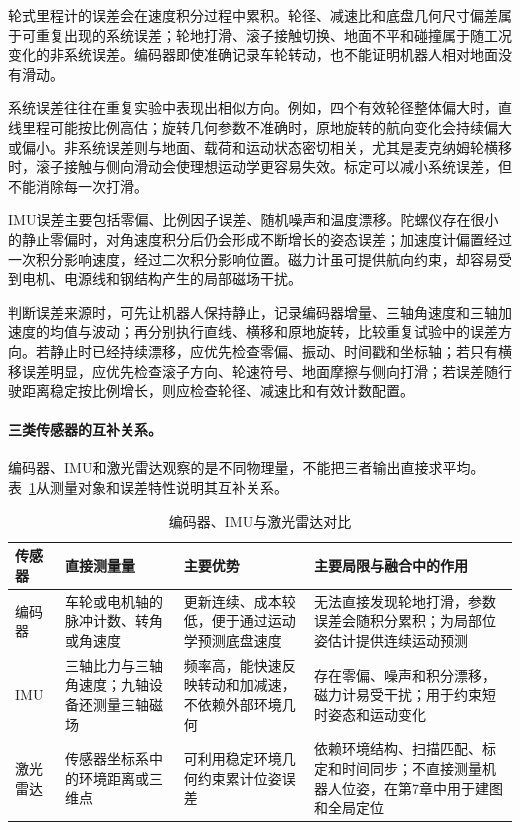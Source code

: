 \documentclass[UTF8,zihao=-4]{ctexart}
\begin{document}
轮式里程计的误差会在速度积分过程中累积。轮径、减速比和底盘几何尺寸偏差属于可重复出现的系统误差；轮地打滑、滚子接触切换、地面不平和碰撞属于随工况变化的非系统误差。编码器即使准确记录车轮转动，也不能证明机器人相对地面没有滑动\cite{borenstein1996}。

系统误差往往在重复实验中表现出相似方向。例如，四个有效轮径整体偏大时，直线里程可能按比例高估；旋转几何参数不准确时，原地旋转的航向变化会持续偏大或偏小。非系统误差则与地面、载荷和运动状态密切相关，尤其是麦克纳姆轮横移时，滚子接触与侧向滑动会使理想运动学更容易失效。标定可以减小系统误差，但不能消除每一次打滑。

IMU误差主要包括零偏、比例因子误差、随机噪声和温度漂移。陀螺仪存在很小的静止零偏时，对角速度积分后仍会形成不断增长的姿态误差；加速度计偏置经过一次积分影响速度，经过二次积分影响位置。磁力计虽可提供航向约束，却容易受到电机、电源线和钢结构产生的局部磁场干扰\cite{fan2025fusion}。

判断误差来源时，可先让机器人保持静止，记录编码器增量、三轴角速度和三轴加速度的均值与波动；再分别执行直线、横移和原地旋转，比较重复试验中的误差方向。若静止时已经持续漂移，应优先检查零偏、振动、时间戳和坐标轴；若只有横移误差明显，应优先检查滚子方向、轮速符号、地面摩擦与侧向打滑；若误差随行驶距离稳定按比例增长，则应检查轮径、减速比和有效计数配置。

\paragraph{三类传感器的互补关系。}
编码器、IMU和激光雷达观察的是不同物理量，不能把三者输出直接求平均。表~\ref{tab:sensor-complementarity}从测量对象和误差特性说明其互补关系。

\begin{table}[htbp]
  \centering
  \caption{编码器、IMU与激光雷达对比}
  \label{tab:sensor-complementarity}
  \begin{tabular}{p{}p{}p{}p{}}
    \toprule
    传感器 & 直接测量量 & 主要优势 & 主要局限与融合中的作用 \\
    \midrule
    编码器 & 车轮或电机轴的脉冲计数、转角或角速度 & 更新连续、成本较低，便于通过运动学预测底盘速度 & 无法直接发现轮地打滑，参数误差会随积分累积；为局部位姿估计提供连续运动预测 \\
    IMU & 三轴比力与三轴角速度；九轴设备还测量三轴磁场 & 频率高，能快速反映转动和加减速，不依赖外部环境几何 & 存在零偏、噪声和积分漂移，磁力计易受干扰；用于约束短时姿态和运动变化 \\
    激光雷达 & 传感器坐标系中的环境距离或三维点 & 可利用稳定环境几何约束累计位姿误差 & 依赖环境结构、扫描匹配、标定和时间同步；不直接测量机器人位姿，在第7章中用于建图和全局定位\cite{ros2laserscan,fan2025fusion} \\
    \bottomrule
  \end{tabular}
\end{table}
\end{document}
